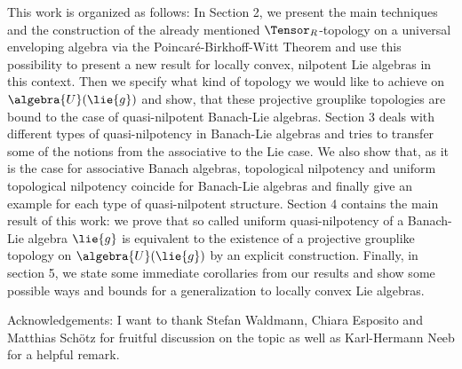 \documentclass[
11pt,                          %
english                        %
]{article}
\begin{document}
This work is organized as follows: In Section 2, we present the main techniques and 
the construction of the already mentioned $\Tensor_R$-topology on a universal 
enveloping algebra via the Poincar\'e-Birkhoff-Witt Theorem and use this possibility 
to present a new result for locally convex, nilpotent Lie algebras in this context. 
Then we specify what kind of topology we would like to achieve on $\algebra{U}
(\lie{g})$ and show, that these projective grouplike topologies are bound to the case 
of quasi-nilpotent Banach-Lie algebras. Section 3 deals with different types of 
quasi-nilpotency in Banach-Lie algebras and tries to transfer some of the notions 
from the associative to the Lie case. We also show that, as it is the case for 
associative Banach algebras, topological nilpotency and uniform topological 
nilpotency coincide for Banach-Lie algebras and finally give an example for each type 
of quasi-nilpotent structure. Section 4 contains the main result of this 
work: we prove that so called uniform quasi-nilpotency of a Banach-Lie algebra 
$\lie{g}$ is equivalent to the existence of a projective grouplike topology on 
$\algebra{U}(\lie{g})$ by an explicit construction. Finally, in section 5, we state 
some immediate corollaries from our results and show some possible ways and bounds 
for a generalization to locally convex Lie algebras.

Acknowledgements: I want to thank Stefan Waldmann, Chiara Esposito and Matthias 
Sch\"otz for fruitful discussion on the topic as well as Karl-Hermann Neeb for a 
helpful remark.
\end{document}

